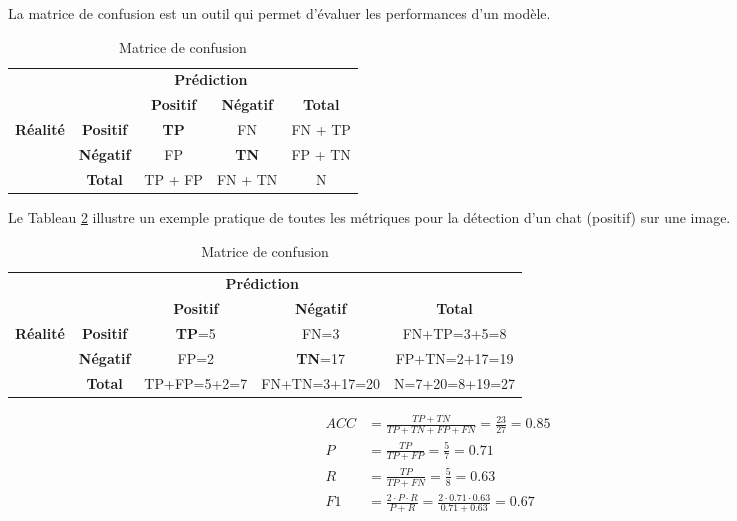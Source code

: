 La matrice de confusion est un outil qui permet d'évaluer les performances d'un modèle.

\begin{table}[H]
    \centering
    \begin{tabular}{|c|c|c|c|c|}
    \cline{3-4}
    \multicolumn{1}{c}{} & \multicolumn{1}{c|}{} & \multicolumn{2}{c|}{\textbf{Prédiction}} & \multicolumn{1}{c}{} \\
    \cline{3-5}
    \multicolumn{1}{c}{} & \multicolumn{1}{c|}{} & \textbf{Positif} & \textbf{Négatif} & \textbf{Total} \\
    \hline
    \multirow{2}{*}{\textbf{Réalité}} & \textbf{Positif} & \textbf{TP} & FN & FN + TP \\
    \cline{2-5}
    & \textbf{Négatif} & FP & \textbf{TN} & FP + TN \\
    \hline
    \multicolumn{1}{c|}{} & \textbf{Total} & TP + FP & FN + TN & N \\
    \cline{2-5}
    \end{tabular}
    \caption{Matrice de confusion}
    \label{tab:matrice_confusion}
\end{table}

Le Tableau \ref{tab:matrice_confusion_exemple} illustre un exemple pratique de toutes les métriques pour la détection d'un chat (positif) sur une image.

\begin{table}[H]
    \centering
    \begin{tabular}{|c|c|c|c|c|}
    \cline{3-4}
    \multicolumn{1}{c}{} & \multicolumn{1}{c|}{} & \multicolumn{2}{c|}{\textbf{Prédiction}} & \multicolumn{1}{c}{} \\
    \cline{3-5}
    \multicolumn{1}{c}{} & \multicolumn{1}{c|}{} & \textbf{Positif} & \textbf{Négatif} & \textbf{Total} \\
    \hline
    \multirow{2}{*}{\textbf{Réalité}} & \textbf{Positif} & \textbf{TP}=5 & FN=3 & FN+TP=3+5=8 \\
    \cline{2-5}
    & \textbf{Négatif} & FP=2 & \textbf{TN}=17 & FP+TN=2+17=19 \\
    \hline
    \multicolumn{1}{c|}{} & \textbf{Total} & TP+FP=5+2=7 & FN+TN=3+17=20 & N=7+20=8+19=27 \\
    \cline{2-5}
    \end{tabular}
    \caption{Matrice de confusion}
    \label{tab:matrice_confusion_exemple}
\end{table}

\begin{align}
    ACC &= \frac{TP + TN}{TP + TN + FP + FN} = \frac{23}{27} = 0.85 \\
    P &= \frac{TP}{TP + FP} = \frac{5}{7} = 0.71 \\
    R &= \frac{TP}{TP + FN} = \frac{5}{8} = 0.63 \\
    F1 &= \frac{2 \cdot P \cdot R}{P + R} = \frac{2 \cdot 0.71 \cdot 0.63}{0.71 + 0.63} = 0.67
    \label{eq:metriques_exemple}
\end{align}

